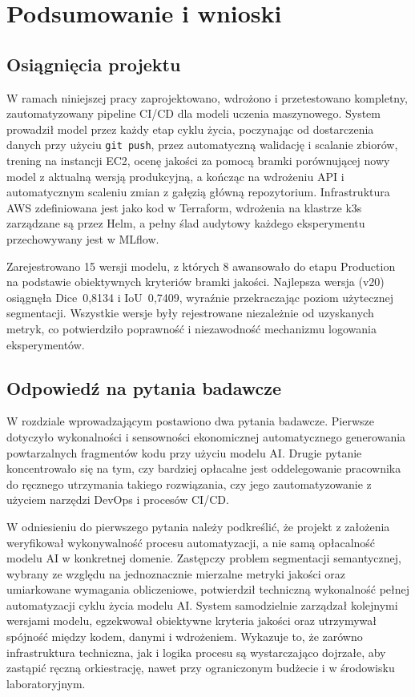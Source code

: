 \section{Podsumowanie i wnioski}
\label{sec:Podsumowanie}

\subsection{Osiągnięcia projektu}

W ramach niniejszej pracy zaprojektowano, wdrożono i przetestowano kompletny, zautomatyzowany pipeline CI/CD dla modeli uczenia maszynowego. System prowadził model przez każdy etap cyklu życia, poczynając od dostarczenia danych przy użyciu \texttt{git push}, przez automatyczną walidację i scalanie zbiorów, trening na instancji EC2, ocenę jakości za pomocą bramki porównującej nowy model z aktualną wersją produkcyjną, a kończąc na wdrożeniu API i automatycznym scaleniu zmian z gałęzią główną repozytorium. Infrastruktura AWS zdefiniowana jest jako kod w Terraform, wdrożenia na klastrze k3s zarządzane są przez Helm, a pełny ślad audytowy każdego eksperymentu przechowywany jest w MLflow.

Zarejestrowano 15 wersji modelu, z których 8 awansowało do etapu Production na podstawie obiektywnych kryteriów bramki jakości. Najlepsza wersja (v20) osiągnęła Dice~0{,}8134 i IoU~0{,}7409, wyraźnie przekraczając poziom użytecznej segmentacji. Wszystkie wersje były rejestrowane niezależnie od uzyskanych metryk, co potwierdziło poprawność i niezawodność mechanizmu logowania eksperymentów.

\subsection{Odpowiedź na pytania badawcze}

W rozdziale wprowadzającym postawiono dwa pytania badawcze. Pierwsze dotyczyło wykonalności i sensowności ekonomicznej automatycznego generowania powtarzalnych fragmentów kodu przy użyciu modelu AI. Drugie pytanie koncentrowało się na tym, czy bardziej opłacalne jest oddelegowanie pracownika do ręcznego utrzymania takiego rozwiązania, czy jego zautomatyzowanie z użyciem narzędzi DevOps i procesów CI/CD.

W odniesieniu do pierwszego pytania należy podkreślić, że projekt z założenia weryfikował wykonywalność procesu automatyzacji, a nie samą opłacalność modelu AI w konkretnej domenie. Zastępczy problem segmentacji semantycznej, wybrany ze względu na jednoznacznie mierzalne metryki jakości oraz umiarkowane wymagania obliczeniowe, potwierdził techniczną wykonalność pełnej automatyzacji cyklu życia modelu AI. System samodzielnie zarządzał kolejnymi wersjami modelu, egzekwował obiektywne kryteria jakości oraz utrzymywał spójność między kodem, danymi i wdrożeniem. Wykazuje to, że zarówno infrastruktura techniczna, jak i logika procesu są wystarczająco dojrzałe, aby zastąpić ręczną orkiestrację, nawet przy ograniczonym budżecie i w środowisku laboratoryjnym.

